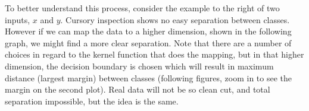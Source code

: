 \documentclass[english,nohyper,titlepage]{tufte-handout}\usepackage{knitr}
\begin{document}
To better understand this process, consider the example to the right of two inputs, $x$ and $y$. Cursory inspection shows no easy separation between classes.  However if we can map the data to a higher dimension, shown in the following graph, we might find a more clear separation. Note that there are a number of choices in regard to the kernel function that does the mapping, but in that higher dimension, the decision boundary is chosen which will result in maximum distance (largest margin) between classes (following figures, zoom in to see the margin on the second plot).  Real data will not be so clean cut, and total separation impossible, but the idea is the same.
\end{document}
